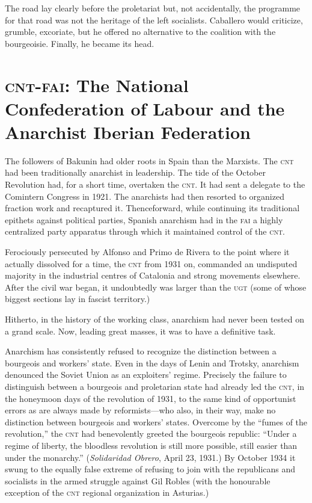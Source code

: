 The road lay clearly before the proletariat but, not accidentally, the programme for that road was not the heritage of the left socialists. Caballero would criticize, grumble, excoriate, but he offered no alternative to the coalition with the bourgeoisie. Finally, he became its head.

\section{\textsc{cnt-fai}: The National Confederation of Labour and the Anarchist Iberian Federation}

The followers of Bakunin had older roots in Spain than the Marxists. The \textsc{cnt} had been traditionally anarchist in leadership. The tide of the October Revolution had, for a short time, overtaken the \textsc{cnt}. It had sent a delegate to the Comintern Congress in 1921. The anarchists had then resorted to organized fraction work and recaptured it. Thenceforward, while continuing its traditional epithets against political parties, Spanish anarchism had in the \textsc{fai} a highly centralized party apparatus through which it maintained control of the \textsc{cnt}.

Ferociously persecuted by Alfonso and Primo de Rivera to the point where it actually dissolved for a time, the \textsc{cnt} from 1931 on, commanded an undisputed majority in the industrial centres of Catalonia and strong movements elsewhere. After the civil war began, it undoubtedly was larger than the \textsc{ugt} (some of whose biggest sections lay in fascist territory.)

Hitherto, in the history of the working class, anarchism had never been tested on a grand scale. Now, leading great masses, it was to have a definitive task.

Anarchism has consistently refused to recognize the distinction between a bourgeois and workers’ state. Even in the days of Lenin and Trotsky, anarchism denounced the Soviet Union as an exploiters’ regime. Precisely the failure to distinguish between a bourgeois and proletarian state had already led the \textsc{cnt}, in the honeymoon days of the revolution of 1931, to the same kind of opportunist errors as are always made by reformists---who also, in their way, make no distinction between bourgeois and workers’ states. Overcome by the ``fumes of the revolution,'' the \textsc{cnt} had benevolently greeted the bourgeois republic: ``Under a regime of liberty, the bloodless revolution is still more possible, still easier than under the monarchy.'' (\emph{Solidaridad Obrero}, April 23, 1931.) By October 1934 it swung to the equally false extreme of refusing to join with the republicans and socialists in the armed struggle against Gil Robles (with the honourable exception of the \textsc{cnt} regional organization in Asturias.)

